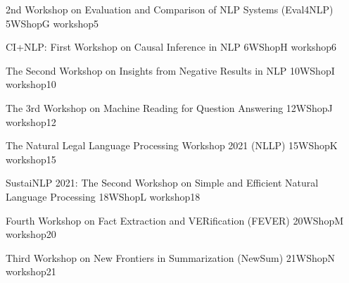 
\begin{wsschedule}
  {2nd Workshop on Evaluation and Comparison of NLP Systems (Eval4NLP)}
  {5}{WShopG}
  {workshop5}
  {\WShopLocF}
  
\end{wsschedule}

\begin{wsschedule}
  {CI+NLP: First Workshop on Causal Inference in NLP}
  {6}{WShopH}
  {workshop6}
  {\WShopLocG}
  
\end{wsschedule}

\begin{wsschedule}
  {The Second Workshop on Insights from Negative Results in NLP}
  {10}{WShopI}
  {workshop10}
  {\WShopLocH}
  
\end{wsschedule}

\begin{wsschedule}
  {The 3rd Workshop on Machine Reading for Question Answering}
  {12}{WShopJ}
  {workshop12}
  {\WShopLocH}
  
\end{wsschedule}

\begin{wsschedule}
  {The Natural Legal Language Processing Workshop 2021 (NLLP) }
  {15}{WShopK}
  {workshop15}
  {\WShopLocH}
  
\end{wsschedule}

\begin{wsschedule}
  {SustaiNLP 2021: The Second Workshop on Simple and Efficient Natural Language Processing}
  {18}{WShopL}
  {workshop18}
  {\WShopLocH}
  
\end{wsschedule}

\begin{wsschedule}
  {Fourth Workshop on Fact Extraction and VERification (FEVER)}
  {20}{WShopM}
  {workshop20}
  {\WShopLocH}
  
\end{wsschedule}

\begin{wsschedule}
  {Third Workshop on New Frontiers in Summarization (NewSum)}
  {21}{WShopN}
  {workshop21}
  {\WShopLocH}
  
\end{wsschedule}


